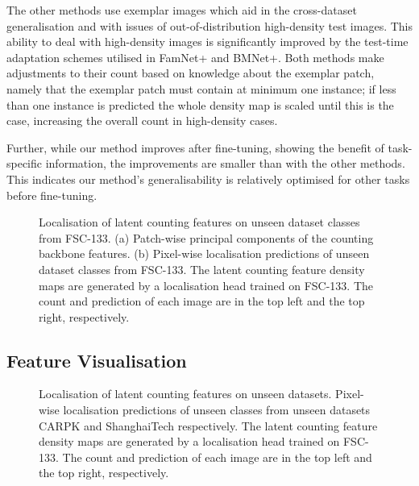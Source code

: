 \documentclass[../thesis.tex]{subfiles}
\begin{document}
The other methods use exemplar images which aid in the cross-dataset generalisation and with issues of out-of-distribution high-density test images. 
This ability to deal with high-density images is significantly improved by the test-time adaptation schemes utilised in FamNet+ and BMNet+. Both methods make adjustments to their count based on knowledge about the exemplar patch, namely that the exemplar patch must contain at minimum one instance; if less than one instance is predicted the whole density map is scaled until this is the case, increasing the overall count in high-density cases.

Further, while our method improves after fine-tuning, showing the benefit of task-specific information, the improvements are smaller than with the other methods. 
This indicates our method's generalisability is relatively optimised for other tasks before fine-tuning.

\begin{table}
    \centering
    
    \caption{Generalisation performance on CARPK. ``Pretrained'' models were trained on FSC-147 or, for our method, FSC-133. ``Fine-tuned'' models were further trained on the CARPK dataset. 
    We highlight the top results with and without exemplar images and with and without fine-tuning.
    Methods in grey were made public after this work.
    \label{table__LTCA__table_carpk}
}
\end{table}

\begin{figure}
    \centering
    
    \caption{Localisation of latent counting features on unseen dataset classes from FSC-133. (a) Patch-wise principal components of the counting backbone features. (b) Pixel-wise localisation predictions of unseen dataset classes from FSC-133. The latent counting feature density maps are generated by a localisation head trained on FSC-133.
The count and prediction of each image are in the top left and the top right, respectively.}
    \label{fig__LTCA__figure_visualisation}
\end{figure}
\subsection{Feature Visualisation}
\label{LTCA__sec__results_visualisation}






\begin{figure}
    \centering
    
    \caption{Localisation of latent counting features on unseen datasets.  Pixel-wise localisation predictions of unseen classes from unseen datasets CARPK and ShanghaiTech respectively. The latent counting feature density maps are generated by a localisation head trained on FSC-133.
    The count and prediction of each image are in the top left and the top right, respectively. }
    \label{fig__LTCA__figure_vis_local_shanghaiandcarpk}
\end{figure}
\end{document}
